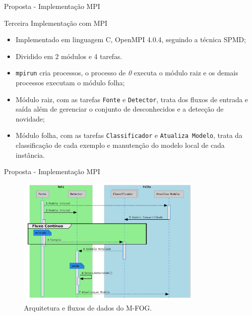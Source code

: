 \documentclass[aspectratio=1610,10pt]{beamer}
\newcommand{\fonte}[1]{\vspace{-1em}{\footnotesize\textbf{Fonte:} #1}}
\newcommand{\mfog}{M-FOG\xspace}
\begin{document}
\begin{frame}[fragile]{Proposta - Implementação MPI}
\begin{alertblock}{Terceira Implementação com MPI}
  \begin{itemize}
    \item Implementado em linguagem C, OpenMPI 4.0.4, seguindo a técnica SPMD;
    \item Dividido em 2 módulos e 4 tarefas.
    \item \texttt{mpirun} cria processos, o processo de \emph{0} executa o
    módulo raiz e os demais processos executam o módulo folha;
    \item Módulo raiz, com as tarefas \texttt{Fonte} e \texttt{Detector}, trata
    dos fluxos de entrada e saída além de gerenciar o conjunto de desconhecidos
    e a detecção de novidade;
    \item Módulo folha, com as tarefas \texttt{Classificador} e \texttt{Atualiza Modelo},
    trata da classificação de cada exemplo e manutenção do modelo local de cada instância.
  \end{itemize}
\end{alertblock}
\end{frame}

\begin{frame}[fragile]{Proposta - Implementação MPI}
  \begin{figure}[h]
    \centering
    \vspace{-0.5em}
    \includegraphics[width=0.8\textwidth,page=1]{figures/lifecycle-uml-svg.pdf}
    \vspace{-0.5em}
    \caption{Arquitetura e fluxos de dados do \mfog.}
    \vspace{-0.5em}
    \fonte{O autor.}
    \label{fig:arch}
  \end{figure}
\end{frame}
\end{document}
